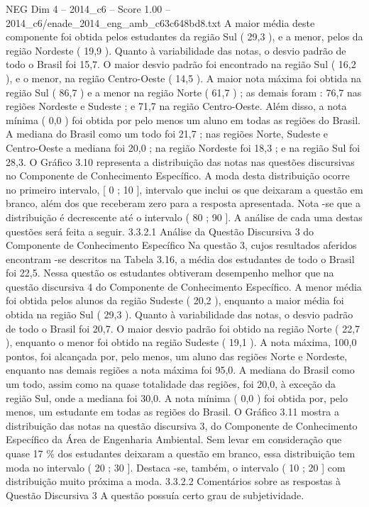 \begin{textsample}{NEG Dim 4 – 2014\_c6 – Score 1.00 – 2014\_c6/enade\_2014\_eng\_amb\_c63c648bd8.txt}
A maior média deste componente foi obtida pelos estudantes da região Sul ( 29,3 ), e a menor, pelos da região Nordeste ( 19,9 ).
Quanto à variabilidade das notas, o desvio padrão de todo o Brasil foi 15,7.
O maior desvio padrão foi encontrado na região Sul ( 16,2 ), e o menor, na região Centro-Oeste ( 14,5 ).
A maior nota máxima foi obtida na região Sul ( 86,7 ) e a menor na região Norte ( 61,7 ) ; as demais foram : 76,7 nas regiões Nordeste e Sudeste ; e 71,7 na região Centro-Oeste.
Além disso, a nota mínima ( 0,0 ) foi obtida por pelo menos um aluno em todas as regiões do Brasil.
A mediana do Brasil como um todo foi 21,7 ; nas regiões Norte, Sudeste e Centro-Oeste a mediana foi 20,0 ; na região Nordeste foi 18,3 ; e na região Sul foi 28,3.
O Gráfico 3.10 representa a distribuição das notas nas questões discursivas no Componente de Conhecimento Específico.
A moda desta distribuição ocorre no primeiro intervalo, [ 0 ; 10 ], intervalo que inclui os que deixaram a questão em branco, além dos que receberam zero para a resposta apresentada.
Nota -se que a distribuição é decrescente até o intervalo ( 80 ; 90 ].
A análise de cada uma destas questões será feita a seguir. 3.3.2.1 Análise da Questão Discursiva 3 do Componente de Conhecimento Específico Na questão 3, cujos resultados aferidos encontram -se descritos na Tabela 3.16, a média dos estudantes de todo o Brasil foi 22,5.
Nessa questão os estudantes obtiveram desempenho melhor que na questão discursiva 4 do Componente de Conhecimento Específico.
A menor média foi obtida pelos alunos da região Sudeste ( 20,2 ), enquanto a maior média foi obtida na região Sul ( 29,3 ).
Quanto à variabilidade das notas, o desvio padrão de todo o Brasil foi 20,7.
O maior desvio padrão foi obtido na região Norte ( 22,7 ), enquanto o menor foi obtido na região Sudeste ( 19,1 ).
A nota máxima, 100,0 pontos, foi alcançada por, pelo menos, um aluno das regiões Norte e Nordeste, enquanto nas demais regiões a nota máxima foi 95,0.
A mediana do Brasil como um todo, assim como na quase totalidade das regiões, foi 20,0, à exceção da região Sul, onde a mediana foi 30,0.
A nota mínima ( 0,0 ) foi obtida por, pelo menos, um estudante em todas as regiões do Brasil.
O Gráfico 3.11 mostra a distribuição das notas na questão discursiva 3, do Componente de Conhecimento Específico da Área de Engenharia Ambiental.
Sem levar em consideração que quase 17 \% dos estudantes deixaram a questão em branco, essa distribuição tem moda no intervalo ( 20 ; 30 ].
Destaca -se, também, o intervalo ( 10 ; 20 ] com distribuição muito próxima a moda. 3.3.2.2 Comentários sobre as respostas à Questão Discursiva 3 A questão possuía certo grau de subjetividade.

\end{textsample}
